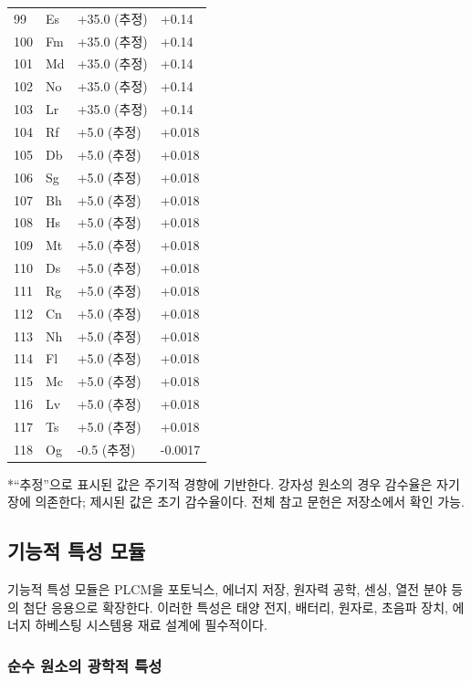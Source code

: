 \documentclass[12pt,a4paper]{article}
\begin{document}
\begin{longtable}{p{0.6cm}p{1.2cm}p{2.5cm}p{2.5cm}}
		99 & Es & +35.0 (추정) & +0.14 \\
		100& Fm & +35.0 (추정) & +0.14 \\
		101& Md & +35.0 (추정) & +0.14 \\
		102& No & +35.0 (추정) & +0.14 \\
		103& Lr & +35.0 (추정) & +0.14 \\
		104& Rf & +5.0 (추정) & +0.018 \\
		105& Db & +5.0 (추정) & +0.018 \\
		106& Sg & +5.0 (추정) & +0.018 \\
		107& Bh & +5.0 (추정) & +0.018 \\
		108& Hs & +5.0 (추정) & +0.018 \\
		109& Mt & +5.0 (추정) & +0.018 \\
		110& Ds & +5.0 (추정) & +0.018 \\
		111& Rg & +5.0 (추정) & +0.018 \\
		112& Cn & +5.0 (추정) & +0.018 \\
		113& Nh & +5.0 (추정) & +0.018 \\
		114& Fl & +5.0 (추정) & +0.018 \\
		115& Mc & +5.0 (추정) & +0.018 \\
		116& Lv & +5.0 (추정) & +0.018 \\
		117& Ts & +5.0 (추정) & +0.018 \\
		118& Og & -0.5 (추정) & -0.0017 \\
		\bottomrule
	\end{longtable}
	*“추정”으로 표시된 값은 주기적 경향에 기반한다. 강자성 원소의 경우 감수율은 자기장에 의존한다; 제시된 값은 초기 감수율이다. 전체 참고 문헌은 저장소에서 확인 가능.
	
	
	\subsection{기능적 특성 모듈}
	\label{subsec:functional-properties}
	
	기능적 특성 모듈은 PLCM을 포토닉스, 에너지 저장, 원자력 공학, 센싱, 열전 분야 등의 첨단 응용으로 확장한다. 이러한 특성은 태양 전지, 배터리, 원자로, 초음파 장치, 에너지 하베스팅 시스템용 재료 설계에 필수적이다.
	
	\subsubsection{순수 원소의 광학적 특성}
	\label{subsec:optical-properties}
	
\end{document}
